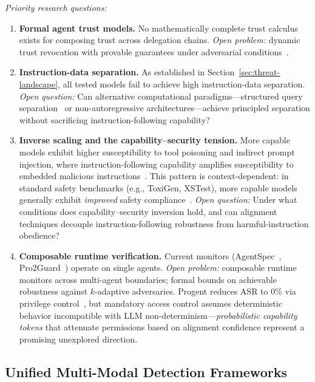 \emph{Priority research questions:}
\begin{enumerate}[nosep,leftmargin=1.5em]
    \item \textbf{Formal agent trust models.} No mathematically complete trust calculus exists for composing trust across delegation chains. \emph{Open problem:} dynamic trust revocation with provable guarantees under adversarial conditions~\cite{trustparadox2025,rodriguez2025did}.
    \item \textbf{Instruction-data separation.} As established in Section~\ref{sec:threat-landscape}, all tested models fail to achieve high instruction-data separation. \emph{Open question:} Can alternative computational paradigms---structured query separation~\cite{chen2025struq} or non-autoregressive architectures---achieve principled separation without sacrificing instruction-following capability?
    \item \textbf{Inverse scaling and the capability--security tension.} More capable models exhibit higher susceptibility to tool poisoning and indirect prompt injection, where instruction-following capability amplifies susceptibility to embedded malicious instructions~\cite{wang2025mcptox,yi2025bipia}. This pattern is context-dependent: in standard safety benchmarks (e.g., ToxiGen, XSTest), more capable models generally exhibit \emph{improved} safety compliance~\cite{rottger2024xstest}. \emph{Open question:} Under what conditions does capability--security inversion hold, and can alignment techniques decouple instruction-following robustness from harmful-instruction obedience?
    \item \textbf{Composable runtime verification.} Current monitors (AgentSpec~\cite{wang2025agentspec}, Pro2Guard~\cite{pro2guard2025}) operate on single agents. \emph{Open problem:} composable runtime monitors across multi-agent boundaries; formal bounds on achievable robustness against $k$-adaptive adversaries. Progent reduces ASR to 0\% via privilege control~\cite{shi2025progent}, but mandatory access control assumes deterministic behavior incompatible with LLM non-determinism---\emph{probabilistic capability tokens} that attenuate permissions based on alignment confidence represent a promising unexplored direction.
\end{enumerate}


\subsection{Unified Multi-Modal Detection Frameworks}
\label{sec:future-detection}

